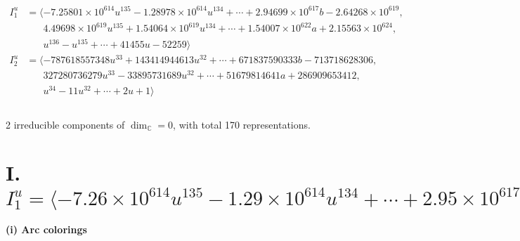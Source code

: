 \documentclass[1p]{elsarticle_modified}
\theoremstyle{definition}
\begin{document}
\begin{align*}
I^u_{1}&=\langle 
-7.25801\times10^{614} u^{135}-1.28978\times10^{614} u^{134}+\cdots+2.94699\times10^{617} b-2.64268\times10^{619},\\
\phantom{I^u_{1}}&\phantom{= \langle  }4.49698\times10^{619} u^{135}+1.54064\times10^{619} u^{134}+\cdots+1.54007\times10^{622} a+2.15563\times10^{624},\\
\phantom{I^u_{1}}&\phantom{= \langle  }u^{136}- u^{135}+\cdots+41455 u-52259\rangle \\
I^u_{2}&=\langle 
-787618557348 u^{33}+143414944613 u^{32}+\cdots+671837590333 b-713718628306,\\
\phantom{I^u_{2}}&\phantom{= \langle  }327280736279 u^{33}-33895731689 u^{32}+\cdots+51679814641 a+286909653412,\\
\phantom{I^u_{2}}&\phantom{= \langle  }u^{34}-11 u^{32}+\cdots+2 u+1\rangle \\
\\
\end{align*}
\raggedright * 2 irreducible components of $\dim_{\mathbb{C}}=0$, with total 170 representations.\\
\newpage
\renewcommand{\arraystretch}{1}
\centering \section*{I. $I^u_{1}= \langle -7.26\times10^{614} u^{135}-1.29\times10^{614} u^{134}+\cdots+2.95\times10^{617} b-2.64\times10^{619},\;4.50\times10^{619} u^{135}+1.54\times10^{619} u^{134}+\cdots+1.54\times10^{622} a+2.16\times10^{624},\;u^{136}- u^{135}+\cdots+41455 u-52259 \rangle$}
\flushleft \textbf{(i) Arc colorings}\\
\end{document}
